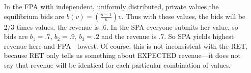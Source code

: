 \documentclass{../ape}
\begin{document}
\begin{solution}
In the FPA with independent, uniformly distributed, private values the equilibrium bids are $b(v) = \left(\frac{n-1}{n}\right) v$. Thus with these values, the bids will be $2/3$ times values, the revenue is $.6$. In the SPA everyone submits her value, so bids are $b_1 = .7$, $b_2 = .9$, $b_3 = .2$ and the revenue is $.7$.
So SPA yields highest revenue here and FPA---lowest.
Of course, this is not inconsistent with the RET, because RET only tells us something about EXPECTED revenue---it does not say that revenue will be identical for each particular combination of values.

\end{solution}
\end{document}
